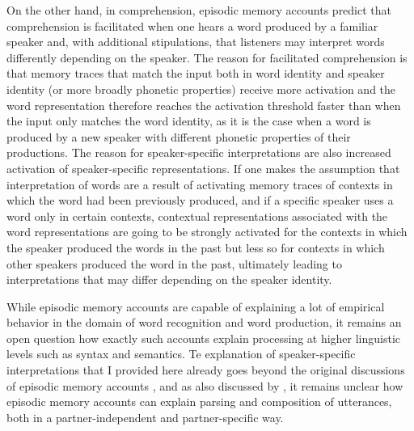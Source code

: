 On the other hand, in comprehension, episodic memory accounts predict that comprehension is facilitated when one hears a word produced by a familiar speaker and, with additional stipulations,
that listeners may interpret words differently depending on the speaker. The reason for facilitated comprehension is that memory traces that match the input both in word identity and
speaker identity (or more broadly phonetic properties) receive more activation and the word representation therefore reaches the activation threshold faster than when the input
only matches the word identity, as it is the case when a word is produced by a new speaker with different phonetic properties of their productions.
The reason for speaker-specific interpretations are also increased activation of speaker-specific representations. If one makes the assumption that interpretation of words are a result
of activating memory traces of contexts in which the word had been previously produced, and if a specific speaker uses a word only in certain contexts,  contextual representations
associated with the word representations are going to be strongly activated for the contexts in which the speaker produced the words in the past but  less so for contexts in which other speakers
produced the word in the past, ultimately leading to interpretations that may differ depending on the speaker identity.


While episodic memory accounts are capable of explaining a lot of empirical behavior in the domain of word recognition and word production,
it remains an open question how exactly such accounts explain processing at higher linguistic levels such as syntax and semantics. 
Te explanation of speaker-specific interpretations that I provided here already goes beyond the original discussions of episodic memory accounts
\parencite[though see, for example,][for episodic memory accounts of partner-specific productions and
comprehension of referring expressions]{Horton2005,Horton2016}, and as also discussed by \textcite{Goldinger1998}, it remains unclear how episodic memory accounts
can explain parsing and composition of utterances, both in a partner-independent and partner-specific way.

